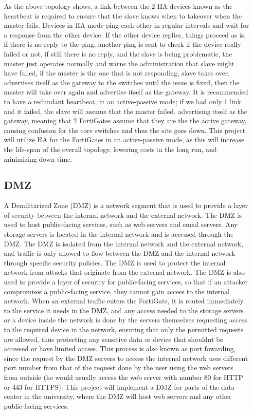\documentclass[12pt]{report}
\begin{document}
As the above topology shows, a link between the 2 HA devices known as the heartbeat is required to ensure that the slave knows when to takeover when the master fails. Devices in HA mode ping each other in regular intervals and wait for a response from the other device. If the other device replies, things proceed as is, if there is no reply to the ping, another ping is sent to check if the device really failed or not, if still there is no reply, and the slave is being problematic, the master just operates normally and warns the administration that slave might have failed, if the master is the one that is not responding, slave takes over, advertises itself as the gateway to the switches until the issue is fixed, then the master will take over again and advertise itself as the gateway. It is recommended to have a redundant heartbeat, in an active-passive mode; if we had only 1 link and it failed, the slave will assume that the master failed, advertising itself as the gateway, meaning that 2 FortiGates assume that they are the the active gateway, causing confusion for the core switches and thus the site goes down. This project will utilize HA for the FortiGates in an active-passive mode, as this will increase the life-span of the overall topology, lowering costs in the long run, and minimizing down-time. \cite{HA} \cite{HA2}

\subsection{DMZ}
A Demilitarized Zone (DMZ) is a network segment that is used to provide a layer of security between the internal network and the external network. The DMZ is used to host public-facing services, such as web servers and email servers. Any storage servers is located in the internal network and is accessed through the DMZ. The DMZ is isolated from the internal network and the external network, and traffic is only allowed to flow between the DMZ and the internal network through specific security policies. The DMZ is used to protect the internal network from attacks that originate from the external network. The DMZ is also used to provide a layer of security for public-facing services, so that if an attacker compromises a public-facing service, they cannot gain access to the internal network. When an external traffic enters the FortiGate, it is routed immediately to the service it needs in the DMZ, and any access needed to the storage servers or a device inside the network is done by the servers themselves requesting access to the required device in the network, ensuring that only the permitted requests are allowed, thus protecting any sensitive data or device that shouldnt be accessed or have limited access. This process is also known as port fowarding, since the request by the DMZ servers to access the internal network uses different port number from that of the request done by the user using the web servers from outside (he would usually access the web server with number 80 for HTTP or 443 for HTTPS). This project will implement a DMZ for parts of the data center in the university, where the DMZ will host web servers and any other public-facing services. \cite{DMZ} 
\end{document}
